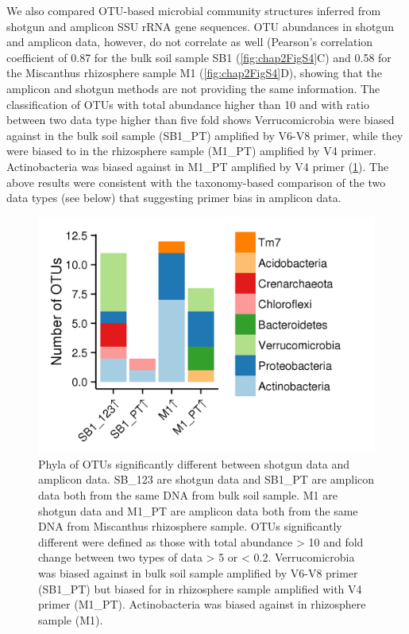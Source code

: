 \documentclass[]{msu-thesis}
\begin{document}
We also compared OTU-based microbial community structures inferred from shotgun and amplicon SSU rRNA gene sequences. OTU abundances in shotgun and amplicon data, however, do not correlate as well (Pearson’s correlation coefficient of 0.87 for the bulk soil sample SB1 (\cref{fig:chap2FigS4}C) and 0.58 for the Miscanthus rhizosphere sample M1 (\cref{fig:chap2FigS4}D), showing that the amplicon and shotgun methods are not providing the same information. The classification of OTUs with total abundance higher than 10 and with ratio between two data type higher than five fold shows Verrucomicrobia were biased against in the bulk soil sample (SB1\_PT) amplified by V6-V8 primer, while they were biased to in the rhizosphere sample (M1\_PT) amplified by V4 primer. Actinobacteria was biased against in M1\_PT amplified by V4 primer (\cref{fig:chap2FigS5}).  The above results were consistent with the taxonomy-based comparison of the two data types (see below) that suggesting primer bias in amplicon data.


\begin{figure}[tbph!]
  \centering
  \includegraphics[scale=1]{figs/chap2_figS5}
  \caption[Phyla of OTUs significantly different between shotgun data and amplicon data]{Phyla of OTUs significantly different between shotgun data and amplicon data. SB\_123 are shotgun data and SB1\_PT are amplicon data both from the same DNA from bulk soil sample. M1 are shotgun data and M1\_PT are amplicon data both from the same DNA from Miscanthus rhizosphere sample. OTUs significantly different were defined as those with total abundance > 10 and fold change between two types of data > 5 or < 0.2. Verrucomicrobia was biased against in bulk soil sample amplified by V6-V8 primer (SB1\_PT) but biased for in rhizosphere sample amplified with V4 primer (M1\_PT). Actinobacteria was biased against in rhizosphere sample (M1).}
  \label{fig:chap2FigS5}
\end{figure}
\end{document}
